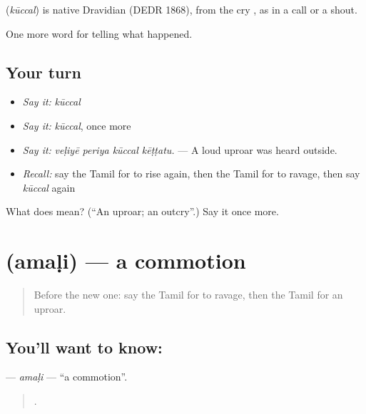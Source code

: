\begin{cousinweb}
\textbf{} (\emph{kūccal}) is native Dravidian (DEDR 1868), from the cry , as in a call or a shout.
\end{cousinweb}

\begin{grammarlens}[title={What you've built}]
One more word for telling what happened.
\end{grammarlens}

\subsection*{Your turn}
\begin{itemize}
\raggedright
  \item \emph{Say it:} \emph{kūccal}
  \item \emph{Say it:} \emph{kūccal}, once more
  \item \emph{Say it:} \emph{veḷiyē periya kūccal kēṭṭatu.} — A loud uproar was heard outside.
  \item \emph{Recall:} say the Tamil for to rise again, then the Tamil for to ravage, then say \emph{kūccal} again
\end{itemize}

\begin{tcolorbox}[breakable,colback=teal!4,colframe=teal!35!black,title={Before you move on}]
What does  mean? (\textquotedblleft{}An uproar; an outcry\textquotedblright{}.) Say it once more.
\end{tcolorbox}
\section[\texorpdfstring{\ta{அமளி} (amaḷi)}{அமளி (amaḷi)}]{ (amaḷi) — a commotion}

\label{lesson:TA-C303-amali}



\begin{quote}
Before the new one: say the Tamil for to ravage, then the Tamil for an uproar.
\end{quote}

\subsection*{You'll want to know: }
\textbf{} — \emph{amaḷi} — \textquotedblleft{}a commotion\textquotedblright{}.

\begin{quote}
   .
\end{quote}


